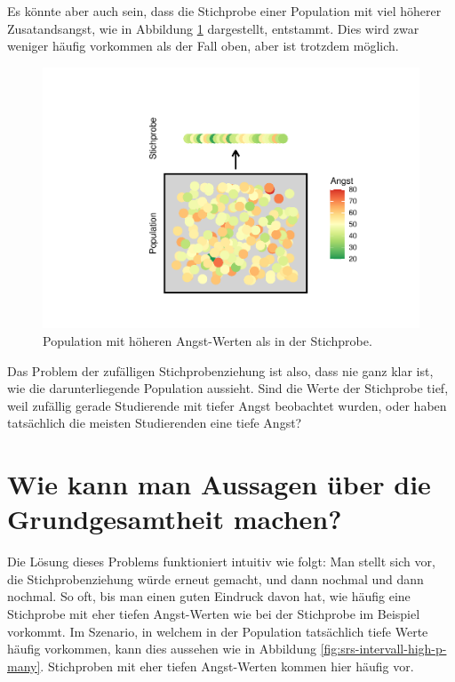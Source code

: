 \documentclass[
]{book}
\theoremstyle{definition}
\theoremstyle{definition}
\theoremstyle{definition}
\theoremstyle{definition}
\theoremstyle{remark}
\begin{document}
Es könnte aber auch sein, dass die Stichprobe einer Population mit viel höherer Zusatandsangst, wie in Abbildung \ref{fig:srs-intervall-low-p} dargestellt, entstammt. Dies wird zwar weniger häufig vorkommen als der Fall oben, aber ist trotzdem möglich.

\begin{figure}
\centering
\includegraphics{aps_statistik1_files/figure-latex/srs-intervall-low-p-1.pdf}
\caption{\label{fig:srs-intervall-low-p}Population mit höheren Angst-Werten als in der Stichprobe.}
\end{figure}

Das Problem der zufälligen Stichprobenziehung ist also, dass nie ganz klar ist, wie die darunterliegende Population aussieht. Sind die Werte der Stichprobe tief, weil zufällig gerade Studierende mit tiefer Angst beobachtet wurden, oder haben tatsächlich die meisten Studierenden eine tiefe Angst?

\section{Wie kann man Aussagen über die Grundgesamtheit machen?}\label{stichprobenziehung-loesung}

Die Lösung dieses Problems funktioniert intuitiv wie folgt: Man stellt sich vor, die Stichprobenziehung würde erneut gemacht, und dann nochmal und dann nochmal. So oft, bis man einen guten Eindruck davon hat, wie häufig eine Stichprobe mit eher tiefen Angst-Werten wie bei der Stichprobe im Beispiel vorkommt. Im Szenario, in welchem in der Population tatsächlich tiefe Werte häufig vorkommen, kann dies aussehen wie in Abbildung \ref{fig:srs-intervall-high-p-many}. Stichproben mit eher tiefen Angst-Werten kommen hier häufig vor.
\end{document}
